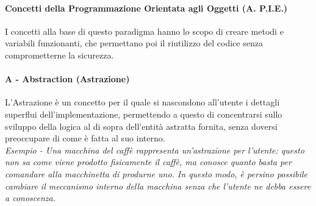 \documentclass{article}
\begin{document}
        \paragraph{Concetti della Programmazione Orientata agli Oggetti (A. P.I.E.)}
        I concetti alla base di questo paradigma hanno lo scopo di creare metodi e variabili funzionanti, che permettano poi il riutilizzo del codice senza comprometterne la sicurezza.
        
        \paragraph{A - Abstraction (Astrazione)} L'Astrazione è un concetto per il quale si nascondono all'utente i dettagli superflui dell'implementazione, permettendo a questo di concentrarsi sullo sviluppo della logica al di sopra dell'entità astratta fornita, senza doversi preoccupare di come è fatta al suo interno.\\
            \textit{Esempio - Una macchina del caffè rappresenta un'astrazione per l'utente: questo non sa come viene prodotto fisicamente il caffè, ma conosce quanto basta per comandare alla macchinetta di produrne uno. In questo modo, è persino possibile cambiare il meccanismo interno della macchina senza che l'utente ne debba essere a conoscenza.}
        
\end{document}
